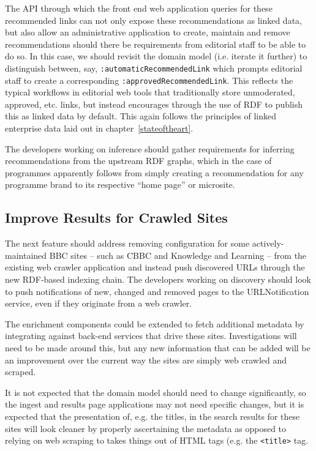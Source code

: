 The API through which the front end web application queries for
these recommended links can not only expose these recommendations
as linked data, but also allow an administrative application
to create, maintain and remove recommendations should there
be requirements from editorial staff to be able to do so. In this
case, we should revisit the domain model (i.e. iterate it further)
to distinguish between, say, \texttt{:automaticRecommendedLink}
which prompts editorial staff to create a corresponding
\texttt{:approvedRecommendedLink}. This reflects the typical
workflows in editorial web tools that traditionally store unmoderated,
approved, etc. links, but instead encourages through the use of RDF
to publish this as linked data by default. This again follows the
principles of linked enterprise data laid out in chapter~\ref{stateoftheart}.

The developers working on inference should gather requirements
for inferring recommendations from the upstream RDF graphs,
which in the case of programmes apparently follows from simply
creating a recommendation for any programme brand to its
respective ``home page'' or microsite.

\subsection{Improve Results for Crawled Sites}

The next feature should address removing configuration for
some actively-maintained BBC sites -- such as CBBC and
Knowledge and Learning -- from the existing web crawler
application and instead push discovered URLs through the new
RDF-based indexing chain. The developers working on discovery
should look to push notifications of new, changed and removed
pages to the URLNotification service, even if they originate
from a web crawler.

The enrichment components could be extended to fetch additional
metadata by integrating against back-end services that drive
these sites. Investigations will need to be made around this,
but any new information that can be added will be an improvement
over the current way the sites are simply web crawled and scraped.

It is not expected that the domain model should need to change
significantly, so the ingest and results page applications may not
need specific changes, but it is expected that the presentation
of, e.g. the titles, in the search results for these sites will look
cleaner by properly ascertaining the metadata as opposed to relying
on web scraping to takes things out of HTML tags (e.g. the \texttt{<title>}
tag.

